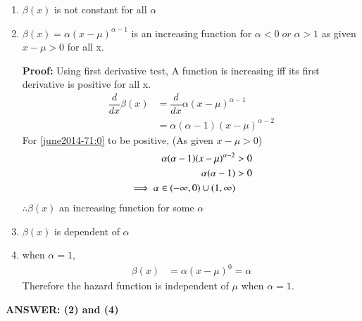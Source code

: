 \begin{enumerate}
    \item $\beta(x)$ is not constant for all $\alpha$
    \item $\beta(x)=\alpha(x-\mu)^{\alpha-1}$ is an increasing function for $\alpha<0 \;or\; \alpha>1$ as given $x-\mu>0$ for all x.
    
    \textbf{Proof: }
    Using first derivative test, A function is increasing iff its first derivative is positive for all x. 
    \begin{align}
        \dfrac{d}{dx} \beta(x)&=  \dfrac{d}{dx} \alpha(x-\mu)^{\alpha-1}\\
        &= \alpha(\alpha-1)(x-\mu)^{\alpha-2}\label{june2014-71:0}
    \end{align}
    For \eqref{june2014-71:0} to be positive, (As given $x-\mu>0$)
    \begin{align}
        \alpha(\alpha-1)(x-\mu)^{\alpha-2}&>0\\
        \alpha(\alpha-1)&>0\\
        \implies \alpha \in \left(-\infty,0\right)\cup \left(1,\infty\right)
    \end{align}
    $\therefore \beta(x)$ an increasing function for some $\alpha$
    \item $\beta(x)$ is dependent of $\alpha$
    \item when $\alpha=1$,
\begin{align}
    \beta(x)&=\alpha(x-\mu)^{0}=\alpha
\end{align}
Therefore the hazard function is independent of $\mu$ when $\alpha=1$.
\end{enumerate}
\textbf{ANSWER: (2) and (4)}
